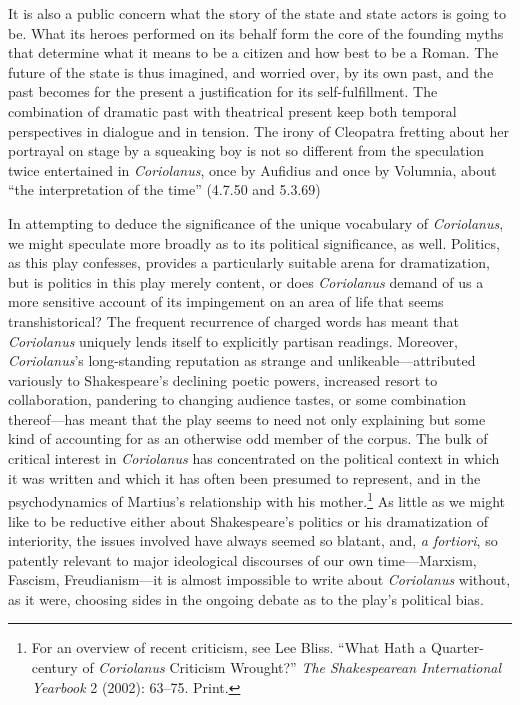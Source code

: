 It is also a public concern what the story of the state and state actors is going to be.
What its heroes performed on its behalf form the core of the founding myths that determine what it means to be a citizen and how best to be a Roman.
The future of the state is thus imagined, and worried over, by its own past, and the past becomes for the present a justification for its self-fulfillment.
The combination of dramatic past with theatrical present keep both temporal perspectives in dialogue and in tension.
The irony of Cleopatra fretting about her portrayal on stage by a squeaking boy is not so different from the speculation twice entertained in \emph{Coriolanus}, once by Aufidius and once by Volumnia, about ``the interpretation of the time'' (4.7.50 and 5.3.69)

In attempting to deduce the significance of the unique vocabulary of \emph{Coriolanus}, we might speculate more broadly as to its political significance, as well.
Politics, as this play confesses, provides a particularly suitable arena for dramatization, but is politics in this play merely content, or does \emph{Coriolanus} demand of us a more sensitive account of its impingement on an area of life that seems transhistorical?
The frequent recurrence of charged words has meant that \emph{Coriolanus} uniquely lends itself to explicitly partisan readings.
Moreover, \emph{Coriolanus}'s long-standing reputation as strange and unlikeable---attributed variously to Shakespeare's declining poetic powers, increased resort to collaboration, pandering to changing audience tastes, or some combination thereof---has meant that the play seems to need not only explaining but some kind of accounting for as an otherwise odd member of the corpus.
The bulk of critical interest in \emph{Coriolanus} has concentrated on the political context in which it was written and which it has often been presumed to represent, and in the psychodynamics of Martius's relationship with his mother.\footnote{For an overview of recent criticism, see Lee Bliss. ``What Hath a Quarter-century of \emph{Coriolanus} Criticism Wrought?'' \emph{The Shakespearean International Yearbook} 2 (2002): 63–75. \nocite{bliss_what_2002}
Print.} 
As little as we might like to be reductive either about Shakespeare's politics or his dramatization of interiority, the issues involved have always seemed so blatant, and, \emph{a fortiori}, so patently relevant to major ideological discourses of our own time---Marxism, Fascism, Freudianism---it is almost impossible to write about \emph{Coriolanus} without, as it were, choosing sides in the ongoing debate as to the play's political bias.
